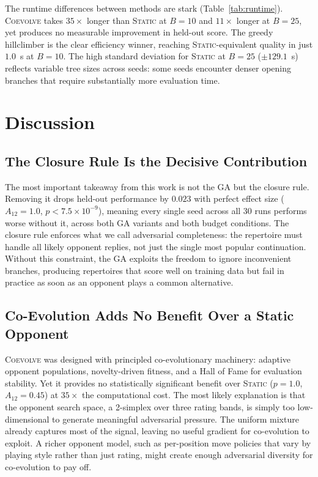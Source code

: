 \documentclass[conference]{IEEEtran}
\begin{document}
The runtime differences between methods are stark (Table~\ref{tab:runtime}).
{\scshape Coevolve} takes $35\times$ longer than {\scshape Static} at
$B = 10$ and $11\times$ longer at $B = 25$, yet produces no measurable
improvement in held-out score. The greedy hillclimber is the clear
efficiency winner, reaching {\scshape Static}-equivalent quality in just
$1.0$~s at $B = 10$. The high standard deviation for {\scshape Static} at
$B = 25$ ($\pm 129.1$~s) reflects variable tree sizes across seeds: some
seeds encounter denser opening branches that require substantially more
evaluation time.



\section{Discussion}

\subsection{The Closure Rule Is the Decisive Contribution}
The most important takeaway from this work is not the GA but the closure rule. Removing it drops held-out performance by $0.023$ with perfect effect
size ($A_{12} = 1.0$, $p < 7.5 \times 10^{-9}$), meaning every single seed
across all 30 runs performs worse without it, across both GA variants and
both budget conditions. The closure rule enforces what we call adversarial completeness: the repertoire must handle all likely
opponent replies, not just the single most popular continuation. Without this constraint, the GA exploits the freedom to ignore inconvenient branches, producing repertoires that score well on training data but fail in practice as soon as an opponent plays a common alternative.

\subsection{Co-Evolution Adds No Benefit Over a Static Opponent}
\textsc{Coevolve} was designed with principled co-evolutionary machinery:
adaptive opponent populations, novelty-driven fitness, and a Hall of Fame
for evaluation stability. Yet it provides no statistically significant
benefit over {\scshape Static} ($p = 1.0$, $A_{12} = 0.45$) at $35\times$
the computational cost. The most likely explanation is that the opponent
search space, a 2-simplex over three rating bands, is simply too
low-dimensional to generate meaningful adversarial pressure. The uniform mixture already captures most of the signal, leaving no useful gradient for
co-evolution to exploit. A richer opponent model, such as per-position move policies that vary by playing style rather than just rating, might create
enough adversarial diversity for co-evolution to pay off.
\end{document}
